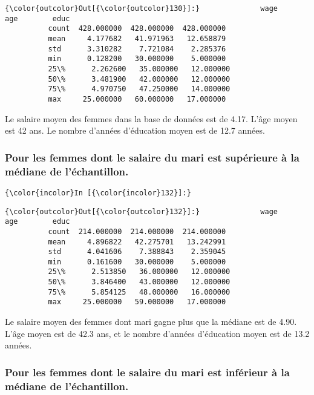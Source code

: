 \documentclass[11pt]{article}
\begin{document}
\begin{Verbatim}[commandchars=\\\{\}]
{\color{outcolor}Out[{\color{outcolor}130}]:}              wage         age        educ
          count  428.000000  428.000000  428.000000
          mean     4.177682   41.971963   12.658879
          std      3.310282    7.721084    2.285376
          min      0.128200   30.000000    5.000000
          25\%      2.262600   35.000000   12.000000
          50\%      3.481900   42.000000   12.000000
          75\%      4.970750   47.250000   14.000000
          max     25.000000   60.000000   17.000000
\end{Verbatim}
            
    Le salaire moyen des femmes dans la base de données est de 4.17. L'âge
moyen est 42 ans. Le nombre d'années d'éducation moyen est de 12.7
années.

    \subsubsection{Pour les femmes dont le salaire du mari est supérieure à
la médiane de
l'échantillon.}\label{pour-les-femmes-dont-le-salaire-du-mari-est-supuxe9rieure-uxe0-la-muxe9diane-de-luxe9chantillon.}

    \begin{Verbatim}[commandchars=\\\{\}]
{\color{incolor}In [{\color{incolor}132}]:} 
\end{Verbatim}


\begin{Verbatim}[commandchars=\\\{\}]
{\color{outcolor}Out[{\color{outcolor}132}]:}              wage         age        educ
          count  214.000000  214.000000  214.000000
          mean     4.896822   42.275701   13.242991
          std      4.041606    7.388843    2.359045
          min      0.161600   30.000000    5.000000
          25\%      2.513850   36.000000   12.000000
          50\%      3.846400   43.000000   12.000000
          75\%      5.854125   48.000000   16.000000
          max     25.000000   59.000000   17.000000
\end{Verbatim}
            
    Le salaire moyen des femmes dont mari gagne plus que la médiane est de
4.90. L'âge moyen est de 42.3 ans, et le nombre d'années d'éducation
moyen est de 13.2 années.

    \subsubsection{Pour les femmes dont le salaire du mari est inférieur à
la médiane de
l'échantillon.}\label{pour-les-femmes-dont-le-salaire-du-mari-est-infuxe9rieur-uxe0-la-muxe9diane-de-luxe9chantillon.}
\end{document}

